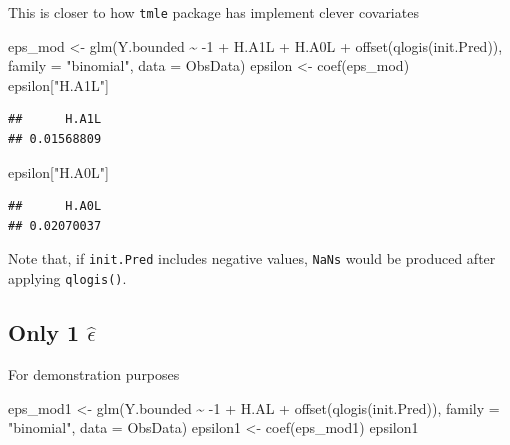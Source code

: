 \documentclass[
]{book}
\newenvironment{Shaded}{\begin{snugshade}}{\end{snugshade}}
\newcommand{\AttributeTok}[1]{\textcolor[rgb]{0.77,0.63,0.00}{#1}}
\newcommand{\DecValTok}[1]{\textcolor[rgb]{0.00,0.00,0.81}{#1}}
\newcommand{\FunctionTok}[1]{\textcolor[rgb]{0.00,0.00,0.00}{#1}}
\newcommand{\NormalTok}[1]{#1}
\newcommand{\OtherTok}[1]{\textcolor[rgb]{0.56,0.35,0.01}{#1}}
\newcommand{\SpecialCharTok}[1]{\textcolor[rgb]{0.00,0.00,0.00}{#1}}
\newcommand{\StringTok}[1]{\textcolor[rgb]{0.31,0.60,0.02}{#1}}
\begin{document}
This is closer to how \texttt{tmle} package has implement clever covariates

\begin{Shaded}
\begin{Highlighting}[]
\NormalTok{eps\_mod }\OtherTok{\textless{}{-}} \FunctionTok{glm}\NormalTok{(Y.bounded }\SpecialCharTok{\textasciitilde{}} \SpecialCharTok{{-}}\DecValTok{1} \SpecialCharTok{+}\NormalTok{ H.A1L }\SpecialCharTok{+}\NormalTok{ H.A0L }\SpecialCharTok{+}  
                 \FunctionTok{offset}\NormalTok{(}\FunctionTok{qlogis}\NormalTok{(init.Pred)), }
               \AttributeTok{family =} \StringTok{"binomial"}\NormalTok{,}
               \AttributeTok{data =}\NormalTok{ ObsData)}
\NormalTok{epsilon }\OtherTok{\textless{}{-}} \FunctionTok{coef}\NormalTok{(eps\_mod)  }
\NormalTok{epsilon[}\StringTok{"H.A1L"}\NormalTok{]}
\end{Highlighting}
\end{Shaded}

\begin{verbatim}
##      H.A1L 
## 0.01568809
\end{verbatim}

\begin{Shaded}
\begin{Highlighting}[]
\NormalTok{epsilon[}\StringTok{"H.A0L"}\NormalTok{] }
\end{Highlighting}
\end{Shaded}

\begin{verbatim}
##      H.A0L 
## 0.02070037
\end{verbatim}

Note that, if \texttt{init.Pred} includes negative values, \texttt{NaNs} would be produced after applying \texttt{qlogis()}.

\hypertarget{only-1-hatepsilon}{%
\subsection{\texorpdfstring{Only 1 \(\hat\epsilon\)}{Only 1 \textbackslash hat\textbackslash epsilon}}\label{only-1-hatepsilon}}

For demonstration purposes

\begin{Shaded}
\begin{Highlighting}[]
\NormalTok{eps\_mod1 }\OtherTok{\textless{}{-}} \FunctionTok{glm}\NormalTok{(Y.bounded }\SpecialCharTok{\textasciitilde{}} \SpecialCharTok{{-}}\DecValTok{1} \SpecialCharTok{+}\NormalTok{ H.AL }\SpecialCharTok{+}
                 \FunctionTok{offset}\NormalTok{(}\FunctionTok{qlogis}\NormalTok{(init.Pred)),}
               \AttributeTok{family =} \StringTok{"binomial"}\NormalTok{,}
               \AttributeTok{data =}\NormalTok{ ObsData)}
\NormalTok{epsilon1 }\OtherTok{\textless{}{-}} \FunctionTok{coef}\NormalTok{(eps\_mod1) }
\NormalTok{epsilon1 }
\end{Highlighting}
\end{Shaded}
\end{document}
